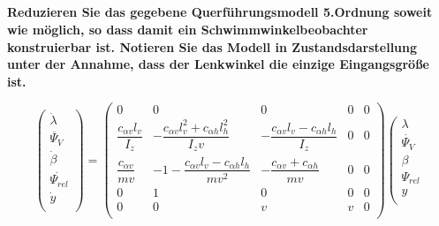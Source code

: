 \subsection{}
\textbf{Reduzieren Sie das gegebene Querführungsmodell 5.Ordnung soweit wie möglich, so dass damit ein Schwimmwinkelbeobachter konstruierbar ist. Notieren Sie das Modell in Zustandsdarstellung unter der Annahme, dass der Lenkwinkel die einzige Eingangsgröße ist.}

\begin{equation}
    \left(
    \begin{array}{c}
            \dot{\lambda}    \\
            \ddot{\Psi_V}    \\
            \dot{\beta}      \\
            \dot{\Psi_{rel}} \\
            \dot{y}          \\
        \end{array}
    \right)=
    \left(
    \begin{array}{ccccc}
            0                                & 0                                                        & 0                                                   & 0 & 0 \\
            \dfrac{c_{\alpha v}l_{v}}{I_{z}} & -\dfrac{c_{\alpha v}l_{v}^2+c_{\alpha h}l_{h}^2}{I_{z}v} & -\dfrac{c_{\alpha v}l_{v}-c_{\alpha h}l_{h}}{I_{z}} & 0 & 0 \\
            \dfrac{c_{\alpha v}}{mv}         & -1-\dfrac{c_{\alpha v}l_{v}-c_{\alpha h}l_{h}}{mv^2}     & -\dfrac{c_{\alpha v}+c_{\alpha h}}{mv}              & 0 & 0 \\
            0                                & 1                                                        & 0                                                   & 0 & 0 \\
            0                                & 0                                                        & v                                                   & v & 0 \\
        \end{array}
    \right)
    \left(
    \begin{array}{c}
            \lambda      \\
            \dot{\Psi_V} \\
            \beta        \\
            \Psi_{rel}   \\
            y            \\

\end{array}
\end{equation}
